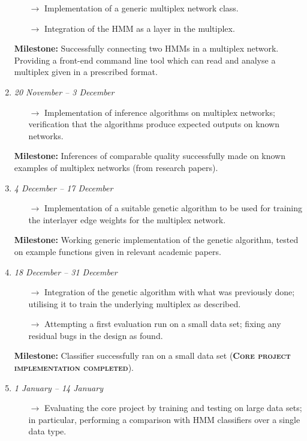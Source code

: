 \begin{enumerate}[label=\bf Slot \arabic*:]
        \begin{itemize}
            \item[$\rightarrow$] Implementation of a generic multiplex network class. 
            \item[$\rightarrow$] Integration of the HMM as a layer in the multiplex.
        \end{itemize}
        \textbf{Milestone:} Successfully connecting two HMMs in a multiplex network. Providing a front-end command line tool which can read and analyse a multiplex given in a prescribed format.
    \item \emph{20 November -- 3 December}
        \begin{itemize}
            \item[$\rightarrow$] Implementation of inference algorithms on multiplex networks; verification that the algorithms produce expected outputs on known networks.
        \end{itemize}
        \textbf{Milestone:} Inferences of comparable quality successfully made on known examples of multiplex networks (from research papers).
    \item \emph{4 December -- 17 December}
        \begin{itemize}
            \item[$\rightarrow$] Implementation of a suitable genetic algorithm to be used for training the interlayer edge weights for the multiplex network.
        \end{itemize}
        \textbf{Milestone:} Working generic implementation of the genetic algorithm, tested on example functions given in relevant academic papers.
    \item \emph{18 December -- 31 December}
        \begin{itemize}
            \item[$\rightarrow$] Integration of the genetic algorithm with what was previously done; utilising it to train the underlying multiplex as described.
            \item[$\rightarrow$] Attempting a first evaluation run on a small data set; fixing any residual bugs in the design as found.
        \end{itemize}
        \textbf{Milestone:} Classifier successfully ran on a small data set (\textbf{\textsc{Core project implementation completed}}).
    \item \emph{1 January -- 14 January}
        \begin{itemize}
            \item[$\rightarrow$] Evaluating the core project by training and testing on large data sets; in particular, performing a comparison with HMM classifiers over a single data type.


\end{itemize}
\end{enumerate}

